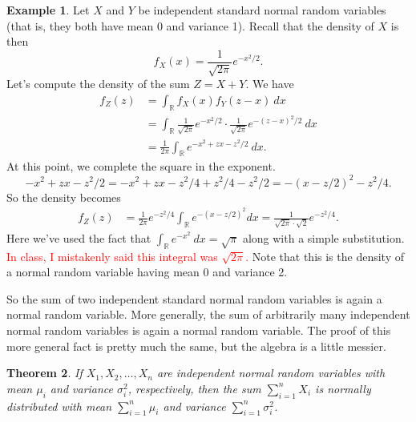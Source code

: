 \documentclass[12pt]{article}
\theoremstyle{plain}
\newtheorem{theorem}{Theorem}[section]
\theoremstyle{definition}
\newtheorem{example}[theorem]{Example}
\theoremstyle{remark}
\newcommand{\R}{\mathbb{R}}
\begin{document}
\begin{example}
    Let $X$ and $Y$ be independent standard normal random variables (that is, they both have mean 0 and variance 1).
    Recall that the density of $X$ is then
    \[
        f_X(x) = \frac{1}{\sqrt{2\pi}}e^{-x^2/2}.
    \]
    Let's compute the density of the sum $Z = X+Y$.
    We have
    \begin{align*}
        f_Z(z) &= \int_\R f_X(x)f_Y(z-x)\ dx\\
        &= \int_\R \frac{1}{\sqrt{2\pi}}e^{-x^2/2}\cdot \frac{1}{\sqrt{2\pi}}e^{-(z-x)^2/2}\ dx\\
        &= \frac{1}{2\pi}\int_\R e^{-x^2 + zx - z^2/2}\ dx.
    \end{align*}
    At this point, we complete the square in the exponent.
    \[
        -x^2 + zx - z^2/2 = -x^2 + zx -z^2/4 + z^2/4 - z^2/2 = -(x-z/2)^2 - z^2/4.
    \]
    So the density becomes
    \begin{align*}
        f_Z(z) &= \frac{1}{2\pi}e^{-z^2/4}\int_\R e^{-(x-z/2)^2}dx = \frac{1}{\sqrt{2\pi}\cdot \sqrt{2}}e^{-z^2/4}.
    \end{align*}
    Here we've used the fact that $\int_\R e^{-x^2}\ dx = \sqrt{\pi}$ along with a simple substitution.
    \textcolor{red}{In class, I mistakenly said this integral was $\sqrt{2\pi}$.}
    Note that this is the density of a normal random variable having mean 0 and variance 2.
\end{example}

So the sum of two independent standard normal random variables is again a normal random variable.
More generally, the sum of arbitrarily many independent normal random variables is again a normal random variable.
The proof of this more general fact is pretty much the same, but the algebra is a little messier.

\begin{theorem}
    If $X_1, X_2, \ldots, X_n$ are independent normal random variables with mean $\mu_i$ and variance $\sigma_i^2$, respectively, then the sum $\sum_{i=1}^nX_i$ is normally distributed with mean $\sum_{i=1}^n\mu_i$ and variance $\sum_{i=1}^n\sigma_i^2$.
\end{theorem}
\end{document}
